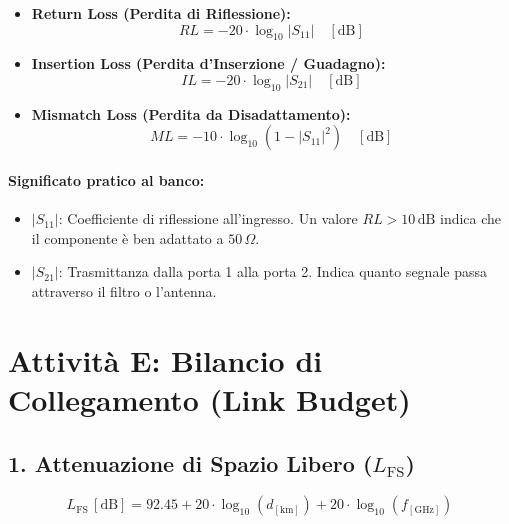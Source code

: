 \documentclass[openany,a4paper,12pt]{book}
\begin{document}
\begin{tcolorbox}[title=Formule dei Parametri di Scattering]
\begin{itemize}
    \item \textbf{Return Loss (Perdita di Riflessione):}
    \[ RL = -20 \cdot \log_{10} |S_{11}| \quad [\text{dB}] \]
    
    \item \textbf{Insertion Loss (Perdita d'Inserzione / Guadagno):}
    \[ IL = -20 \cdot \log_{10} |S_{21}| \quad [\text{dB}] \]
    
    \item \textbf{Mismatch Loss (Perdita da Disadattamento):}
    \[ ML = -10 \cdot \log_{10} (1 - |S_{11}|^2) \quad [\text{dB}] \]
\end{itemize}
\end{tcolorbox}

\paragraph{Significato pratico al banco:}
\begin{itemize}
    \item $|S_{11}|$: Coefficiente di riflessione all'ingresso. Un valore $RL > 10\,\text{dB}$ indica che il componente è ben adattato a $50\,\Omega$.
    \item $|S_{21}|$: Trasmittanza dalla porta 1 alla porta 2. Indica quanto segnale passa attraverso il filtro o l'antenna.
\end{itemize}

\newpage

\section{Attività E: Bilancio di Collegamento (Link Budget)}

\subsection{1. Attenuazione di Spazio Libero ($L_{\text{FS}}$)}

\begin{tcolorbox}[title=Formula Pratica dell'Attenuazione di Tratta]
\[
L_{\text{FS}} \, [\text{dB}] = 92.45 + 20 \cdot \log_{10}(d_{[\text{km}]}) + 20 \cdot \log_{10}(f_{[\text{GHz}]})
\]
\end{tcolorbox}
\end{document}
